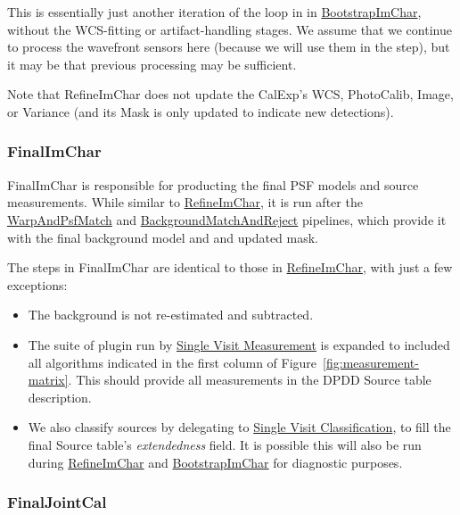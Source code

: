 This is essentially just another iteration of the loop in in \hyperref[sec:drpBootstrapImChar]{BootstrapImChar}, without the WCS-fitting or artifact-handling stages.  We assume that we continue to process the wavefront sensors here (because we will use them in the  step), but it may be that previous processing may be sufficient.

Note that RefineImChar does not update the CalExp's WCS, PhotoCalib, Image, or Variance (and its Mask is only updated to indicate new detections).


\let\hr\undefined

\subsubsection{FinalImChar}
\label{sec:drpFinalImChar}

FinalImChar is responsible for producting the final PSF models and source measurements.  While similar to \hyperref[sec:drpRefineImChar]{RefineImChar}, it is run after the \hyperref[sec:drpWarpAndPsfMatch]{WarpAndPsfMatch} and \hyperref[sec:drpBackgroundMatchAndReject]{BackgroundMatchAndReject} pipelines, which provide it with the final background model and and updated mask.

The steps in FinalImChar are identical to those in \hyperref[sec:drpRefineImChar]{RefineImChar}, with just a few exceptions:

\begin{itemize}
\item The background is not re-estimated and subtracted.
\item The suite of plugin run by \hyperref[sec:acSingleVisitMeasurement]{Single Visit Measurement} is expanded to included all algorithms indicated in the first column of Figure~\ref{fig:measurement-matrix}.  This should provide all measurements in the DPDD Source table description.
\item We also classify sources by delegating to \hyperref[sec:acSingleVisitClassification]{Single Visit Classification}, to fill the final Source table's \emph{extendedness} field.  It is possible this will also be run during \hyperref[sec:drpRefineImChar]{RefineImChar} and \hyperref[sec:drpBootstrapImChar]{BootstrapImChar} for diagnostic purposes.
\end{itemize}

\subsubsection{FinalJointCal}
\label{sec:drpFinalJointCal}

